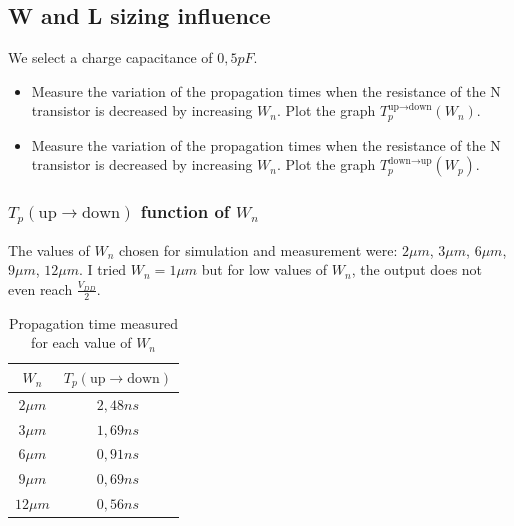 \documentclass[../main.tex]{subfiles}
\begin{document}
	\subsection{W and L sizing influence}
	{
		\begin{tcolorbox}[colback=gray!5!white,colframe=gray!75!black]
			We select a charge capacitance of $0,5pF$.
			\begin{itemize}
				\item Measure the variation of the propagation times when the resistance of the N transistor is decreased by increasing $W_n$. Plot the graph $T_p^{\text{up} \to \text{down}}(W_n)$.
				\item Measure the variation of the propagation times when the resistance of the N transistor is decreased by increasing $W_n$. Plot the graph $T_p^{\text{down} \to \text{up}}(W_p)$.
			\end{itemize}
		\end{tcolorbox}
		
		\subsubsection{$T_p(\text{up} \to \text{down})$ function of $W_n$}
		{
			
			The values of $W_n$ chosen for simulation and measurement were: $2\mu m$, $3\mu m$, $6\mu m$, $9\mu m$, $12\mu m$. I tried $W_n = 1\mu m$ but for low values of $W_n$, the output does not even reach $\frac{V_{DD}}{2}$.
			
			\begin{table}[htbp]
				\centering
				\renewcommand{\arraystretch}{1.5} %
				\begin{tabular}{|c|c|}
					\hline
					$W_n$ & $T_p(\text{up} \to \text{down})$ \\ \hline
					$2\mu m$ & $2,48ns$  \\ \hline
					$3\mu m$ & $1,69ns$ \\ \hline
					$6\mu m$   & $0,91ns$ \\ \hline
					$9\mu m$   & $0,69ns$ \\ \hline
					$12\mu m$   & $0,56ns$ \\ \hline
				\end{tabular}
				\caption{Propagation time measured for each value of $W_n$}
				\label{tab:wndep}
			\end{table}
			
}}
\end{document}
